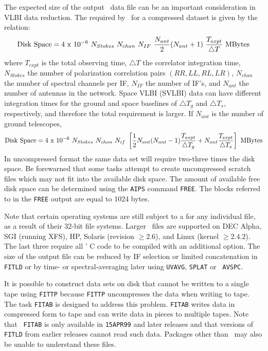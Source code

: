 The expected size of the output \uv\ data file can be an important
consideration in VLBI data reduction. The  required
by \AIPS\ for a compressed dataset is given by the relation:
$${\rm Disk\ Space} = 4\ {\rm x}\ 10^{-6}\ N_{Stokes}\ N_{chan}\
N_{IF}\ {{N_{ant}\over2}(N_{ant}+1)}\ {{T_{expt}}\over{\triangle
T}}\ {\rm MBytes}$$
where $T_{expt}$ is the total observing time, $\triangle T$ the
correlator integration time, $N_{Stokes}$ the number of polarization
correlation pairs $(RR,LL,RL,LR)$, $N_{chan}$ the number of spectral
channels per IF, $N_{IF}$ the number of IF's, and $N_{ant}$ the number
of antennas in the network.  Space VLBI (SVLBI) data can have
different integration times for the ground and space baselines of
$\triangle T_g$ and  $\triangle T_s$, respectively, and therefore the
total \indx{disk space} requirement is larger.  If $N_{ant}$ is the
number of ground telescopes,
 $${\rm Disk\ Space} = 4\ {\rm x}\ 10^{-6}\ N_{Stokes}\ N_{chan}\ N_{if}\
 \left[{1\over2}N_{ant}(N_{ant} - 1){T_{expt}\over \triangle T_g} +
 N_{ant}{T_{expt}\over\triangle T_s}\right]\ {\rm MBytes}$$
In uncompressed format the same data set will require two-three times
the disk space.  Be forewarned that some tasks
attempt to create uncompressed scratch files which may not fit into
the available disk space.  The amount of available free disk space can
be determined using the {\tt AIPS} command {\tt FREE}\@.  The blocks
referred to in the {\tt FREE} output are equal to 1024 bytes.

Note that certain operating systems are still subject to a
 for any individual file, as a result of their
32-bit file systems. Larger \AIPS\ files are supported on DEC Alpha,
SGI (running XFS), HP, Solaris (revision $\ge 2.6$), and Linux (kernel
$\ge 2.4.2$).  The last three require all \AIPS' C code to be compiled
with an additional option.  The size of the output file can be reduced
by IF selection or limited concatenation in {\tt FITLD} or by time- or
spectral-averaging later using {\tt UVAVG}, {\tt SPLAT} or {\tt
AVSPC}\@.

It is possible to construct data sets on disk that cannot be written
to a single tape using {\tt FITTP} because {\tt FITTP} uncompresses
the data when writing to tape.  The task {\tt FITAB} is designed to
address this problem.  {\tt FITAB} writes data in compressed form to
tape and can write data in pieces to multiple tapes.  Note that {\tt
FITAB} is only available in {\tt 15APR99} and later releases and that
versions of {\tt FITLD} from earlier releases cannot read such data.
Packages other than \AIPS\ may also be unable to understand these
files.

